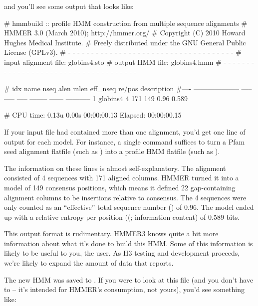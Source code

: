 
and you'll see some output that looks like:

\begin{sreoutput}
# hmmbuild :: profile HMM construction from multiple sequence alignments
# HMMER 3.0 (March 2010); http://hmmer.org/
# Copyright (C) 2010 Howard Hughes Medical Institute.
# Freely distributed under the GNU General Public License (GPLv3).
# - - - - - - - - - - - - - - - - - - - - - - - - - - - - - - - - - - - -
# input alignment file:             globins4.sto
# output HMM file:                  globins4.hmm
# - - - - - - - - - - - - - - - - - - - - - - - - - - - - - - - - - - - -

# idx name                  nseq  alen  mlen eff_nseq re/pos description
#---- -------------------- ----- ----- ----- -------- ------ -----------
1     globins4                 4   171   149     0.96  0.589 

# CPU time: 0.13u 0.00s 00:00:00.13 Elapsed: 00:00:00.15
\end{sreoutput}

If your input file had contained more than one alignment, you'd get
one line of output for each model. For instance, a single
 command suffices to turn a Pfam seed alignment
flatfile (such as ) into a profile HMM flatfile
(such as ).

The information on these lines is almost self-explanatory. The
 alignment consisted of 4 sequences with 171 aligned
columns. HMMER turned it into a model of 149 consensus positions,
which means it defined 22 gap-containing alignment columns to be
insertions relative to consensus. The 4 sequences were only counted as
an ``effective'' total sequence number () of 0.96. The
model ended up with a relative entropy per position ((;
information content) of 0.589 bits.

This output format is rudimentary.  HMMER3 knows quite a bit more
information about what it's done to build this HMM. Some of this
information is likely to be useful to you, the user. As H3 testing and
development proceeds, we're likely to expand the amount of data that
 reports.

The new HMM was saved to . If you were to look at
this file (and you don't have to -- it's intended for HMMER's
consumption, not yours), you'd see something like:

